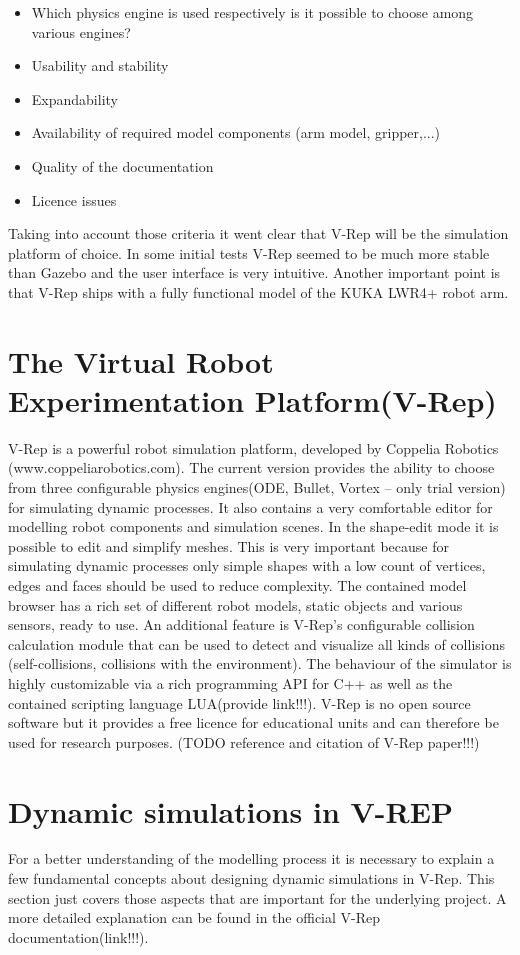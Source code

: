 \begin{itemize}
\item
Which physics engine is used respectively is it possible to choose among various engines?
\item
Usability and stability
\item
Expandability
\item
Availability of required model components (arm model, gripper,...)
\item
Quality of the documentation
\item
Licence issues
\end{itemize}

Taking into account those criteria it went clear that V-Rep will be the simulation platform of choice. In some initial tests V-Rep seemed to be much more stable than Gazebo and the user interface is very intuitive. Another important point is that V-Rep ships with a fully functional model of the KUKA LWR4+ robot arm.

\section{The Virtual Robot Experimentation Platform(V-Rep)}
V-Rep is a powerful robot simulation platform, developed by Coppelia Robotics (www.coppeliarobotics.com). The current version provides the ability to choose from three configurable physics engines(ODE, Bullet, Vortex -- only trial version) for simulating dynamic processes. It also contains a very comfortable editor for modelling robot components and simulation scenes. In the shape-edit mode it is possible to edit and simplify meshes. This is very important because for simulating dynamic processes only simple shapes with a low count of vertices, edges and faces should be used to reduce complexity. The contained model browser has a rich set of different robot models, static objects and various sensors, ready to use. An additional feature is V-Rep's configurable collision calculation module that can be used to detect and visualize all kinds of collisions (self-collisions, collisions with the environment). The behaviour of the simulator is highly customizable via a rich programming API for C++ as well as the contained scripting language LUA(provide link!!!). V-Rep is no open source software but it provides a free licence for educational units and can therefore be used for research purposes. (TODO reference and citation of V-Rep paper!!!)

\section{Dynamic simulations in V-REP}
For a better understanding of the modelling process it is necessary to explain a few fundamental concepts about designing dynamic simulations in V-Rep. This section just covers those aspects that are important for the underlying project. A more detailed explanation can be found in the official V-Rep documentation(link!!!).

